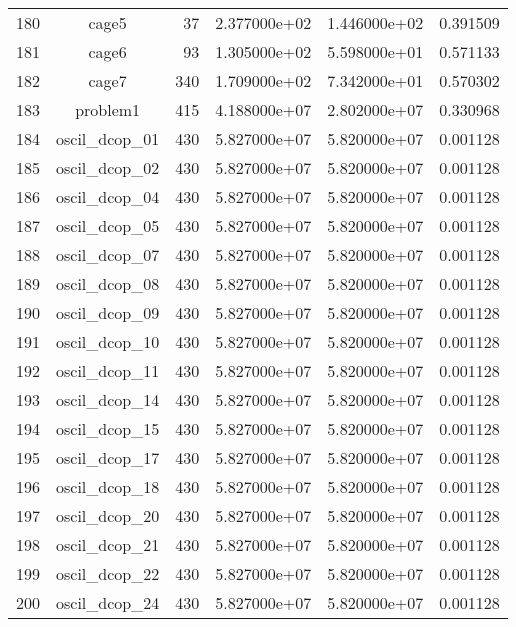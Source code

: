 \documentclass[8pt]{report}
\begin{document}
\begin{table*}
\begin{tabular}{|l|c|r|r|r|r|}
180 &                    cage5 &    37 &  2.377000e+02 &  1.446000e+02 &  0.391509 \\
181 &                    cage6 &    93 &  1.305000e+02 &  5.598000e+01 &  0.571133 \\
182 &                    cage7 &   340 &  1.709000e+02 &  7.342000e+01 &  0.570302 \\
183 &                 problem1 &   415 &  4.188000e+07 &  2.802000e+07 &  0.330968 \\
184 &            oscil\_dcop\_01 &   430 &  5.827000e+07 &  5.820000e+07 &  0.001128 \\
185 &            oscil\_dcop\_02 &   430 &  5.827000e+07 &  5.820000e+07 &  0.001128 \\
186 &            oscil\_dcop\_04 &   430 &  5.827000e+07 &  5.820000e+07 &  0.001128 \\
187 &            oscil\_dcop\_05 &   430 &  5.827000e+07 &  5.820000e+07 &  0.001128 \\
188 &            oscil\_dcop\_07 &   430 &  5.827000e+07 &  5.820000e+07 &  0.001128 \\
189 &            oscil\_dcop\_08 &   430 &  5.827000e+07 &  5.820000e+07 &  0.001128 \\
190 &            oscil\_dcop\_09 &   430 &  5.827000e+07 &  5.820000e+07 &  0.001128 \\
191 &            oscil\_dcop\_10 &   430 &  5.827000e+07 &  5.820000e+07 &  0.001128 \\
192 &            oscil\_dcop\_11 &   430 &  5.827000e+07 &  5.820000e+07 &  0.001128 \\
193 &            oscil\_dcop\_14 &   430 &  5.827000e+07 &  5.820000e+07 &  0.001128 \\
194 &            oscil\_dcop\_15 &   430 &  5.827000e+07 &  5.820000e+07 &  0.001128 \\
195 &            oscil\_dcop\_17 &   430 &  5.827000e+07 &  5.820000e+07 &  0.001128 \\
196 &            oscil\_dcop\_18 &   430 &  5.827000e+07 &  5.820000e+07 &  0.001128 \\
197 &            oscil\_dcop\_20 &   430 &  5.827000e+07 &  5.820000e+07 &  0.001128 \\
198 &            oscil\_dcop\_21 &   430 &  5.827000e+07 &  5.820000e+07 &  0.001128 \\
199 &            oscil\_dcop\_22 &   430 &  5.827000e+07 &  5.820000e+07 &  0.001128 \\
200 &            oscil\_dcop\_24 &   430 &  5.827000e+07 &  5.820000e+07 &  0.001128 \\

\end{tabular}
\end{table*}
\end{document}
